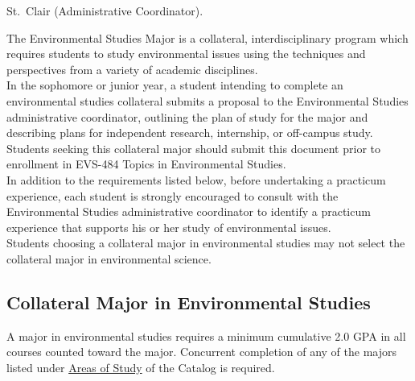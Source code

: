 \documentclass[
  letterpaper,
]{scrbook}
\begin{document}
St.~Clair (Administrative Coordinator).

The Environmental Studies Major is a collateral, interdisciplinary
program which requires students to study environmental issues using the
techniques and perspectives from a variety of academic disciplines.\\
In the sophomore or junior year, a student intending to complete an
environmental studies collateral submits a proposal to the Environmental
Studies administrative coordinator, outlining the plan of study for the
major and describing plans for independent research, internship, or
off-campus study. Students seeking this collateral major should submit
this document prior to enrollment in EVS-484 Topics in Environmental
Studies.\\
In addition to the requirements listed below, before undertaking a
practicum experience, each student is strongly encouraged to consult
with the Environmental Studies administrative coordinator to identify a
practicum experience that supports his or her study of environmental
issues.\\
Students choosing a collateral major in environmental studies may not
select the collateral major in environmental science.

\subsection{Collateral Major in Environmental
Studies}\label{collateral-major-in-environmental-studies}

A major in environmental studies requires a minimum cumulative 2.0 GPA
in all courses counted toward the major. Concurrent completion of any of
the majors listed under
\hyperref[Areasux5cux2520Ofux5cux2520Study]{Areas of Study} of the
Catalog is required.
\end{document}
